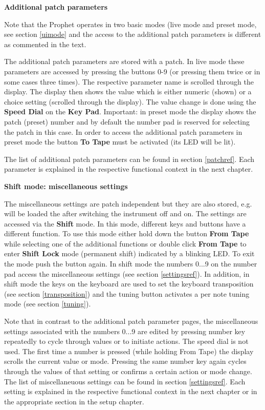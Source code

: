 \documentclass[draft,landscape, 11pt, oneside]{report}
\newenvironment{flowtext}{\addmargin[0cm]{7cm}}{\endaddmargin} %
\begin{document}
\begin{flowtext}
\textbf{Additional patch parameters}

Note that the Prophet operates in two basic modes (live mode and preset mode, see section \ref{uimode} and the access to the additional patch parameters is different as commented in the text.

The additional patch parameters are stored with a patch. In live mode these parameters are accessed by pressing the buttons 0-9 (or pressing them twice or in some cases three times). The respective parameter name is scrolled through the display. The display then shows the value which is either numeric (shown) or a choice setting (scrolled through the display). The value change is done using the \textbf{Speed Dial} on the \textbf{Key Pad}. Important: in preset mode the display shows the patch (preset) number and by default the number pad is reserved for selecting the patch in this case. In order to access the additional patch parameters in preset mode the button \textbf{To Tape} must be activated (its LED will be lit).
       
The list of additional patch parameters can be found in section \ref{patchref}. Each parameter is explained in the respective functional context in the next chapter.

\textbf{Shift mode: miscellaneous settings}

The miscellaneous settings are patch independent but they are also stored, e.g. will be loaded the after switching the instrument off and on. The settings are accessed via the \textbf{Shift} mode. In this mode, different keys and buttons have a different function. To use this mode either hold down the button \textbf{From Tape} while selecting one of the additional functions or double click \textbf{From Tape} to enter \textbf{Shift Lock} mode (permanent shift) indicated by a blinking LED. To exit the mode push the button again. In shift mode the numbers 0...9 on the number pad access the miscellaneous settings (see section \ref{settingsref}). In addition, in shift mode the keys on the keyboard are used to set the keyboard transposition (see section \ref{transposition}) and the tuning button activates a per note tuning mode (see section \ref{tuning}).

Note that in contrast to the additional patch parameter pages, the miscellaneous settings associated with the numbers 0...9 are edited by pressing number key repeatedly to cycle through values or to initiate actions. The speed dial is not used. The first time a number is pressed (while holding From Tape) the display scrolls the current value or mode. Pressing the same number key again cycles through the values of that setting or confirms a certain action or mode change. The list of miscellaneuous settings can be found in section \ref{settingsref}. Each setting is explained in the respective functional context in the next chapter or in the appropriate section in the setup chapter.


\end{flowtext}
\end{document}
